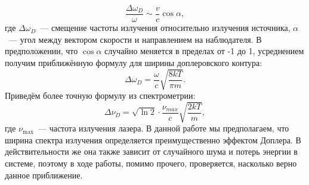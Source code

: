 \documentclass[a4paper,12pt]{article} %
\begin{document}
\begin{equation}\label{dope}
    \frac{\Delta\omega_D}{\omega} \sim \frac{v}{c}\cos\alpha,
\end{equation}
где $\Delta\omega_D$~--- смещение частоты излучения относительно излучения источника, $\alpha$~--- угол между вектором скорости и направлением на наблюдателя. В предположении, что $\cos\alpha$ случайно меняется в пределах от -1 до 1, усреднением получим приближённую формулу для ширины доплеровского контура:
\begin{equation}\label{DoppWidth}
    \Delta\omega_D = \frac{\omega}{c}\sqrt{\frac{8kT}{\pi m}}.
\end{equation}
Приведём более точную формулу из спектрометрии:
\begin{equation}
    \label{cool_DoppWidth}
    \Delta\nu_D = \sqrt{\ln 2}\cdot\frac{\nu_{max}}{c}\sqrt{\frac{2kT}{m}}, 
\end{equation}
где $\nu_\text{max}$~--- частота излучения лазера.
В данной работе мы предполагаем, что ширина спектра излучения определяется преимущественно эффектом Доплера. В действительности же она также зависит от случайного шума и потерь энергии в системе, поэтому в ходе работы, помимо прочего, проверяется, насколько верно данное приближение.
\end{document}
